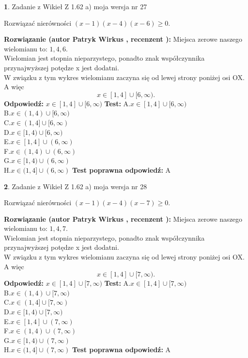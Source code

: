 \documentclass[12pt, a4paper]{article}
\theoremstyle{definition} %
\newtheorem{zad}{}
\newcommand{\zadStart}[1]{\begin{zad}#1\newline}
\newcommand{\zadStop}{\end{zad}}
\newcommand{\rozwStart}[2]{\noindent \textbf{Rozwiązanie (autor #1 , recenzent #2): }\newline}
\newcommand{\rozwStop}{\newline}
\newcommand{\odpStart}{\noindent \textbf{Odpowiedź:}\newline}
\newcommand{\odpStop}{\newline}
\newcommand{\testStart}{\noindent \textbf{Test:}\newline}
\newcommand{\testStop}{\newline}
\newcommand{\kluczStart}{\noindent \textbf{Test poprawna odpowiedź:}\newline}
\newcommand{\kluczStop}{\newline}
\begin{document}
\zadStart{Zadanie z Wikieł Z 1.62 a) moja wersja nr 27}

Rozwiązać nierówności $(x-1)(x-4)(x-6)\ge0$.
\zadStop
\rozwStart{Patryk Wirkus}{}
Miejsca zerowe naszego wielomianu to: $1, 4, 6$.\\
Wielomian jest stopnia nieparzystego, ponadto znak współczynnika przy\linebreak najwyższej potędze x jest dodatni.\\ W związku z tym wykres wielomianu zaczyna się od lewej strony poniżej osi OX. A więc $$x \in [1,4] \cup [6,\infty).$$
\rozwStop
\odpStart
$x \in [1,4] \cup [6,\infty)$
\odpStop
\testStart
A.$x \in [1,4] \cup [6,\infty)$\\
B.$x \in (1,4) \cup [6,\infty)$\\
C.$x \in (1,4] \cup [6,\infty)$\\
D.$x \in [1,4) \cup [6,\infty)$\\
E.$x \in [1,4] \cup (6,\infty)$\\
F.$x \in (1,4) \cup (6,\infty)$\\
G.$x \in [1,4) \cup (6,\infty)$\\
H.$x \in (1,4] \cup (6,\infty)$
\testStop
\kluczStart
A
\kluczStop



\zadStart{Zadanie z Wikieł Z 1.62 a) moja wersja nr 28}

Rozwiązać nierówności $(x-1)(x-4)(x-7)\ge0$.
\zadStop
\rozwStart{Patryk Wirkus}{}
Miejsca zerowe naszego wielomianu to: $1, 4, 7$.\\
Wielomian jest stopnia nieparzystego, ponadto znak współczynnika przy\linebreak najwyższej potędze x jest dodatni.\\ W związku z tym wykres wielomianu zaczyna się od lewej strony poniżej osi OX. A więc $$x \in [1,4] \cup [7,\infty).$$
\rozwStop
\odpStart
$x \in [1,4] \cup [7,\infty)$
\odpStop
\testStart
A.$x \in [1,4] \cup [7,\infty)$\\
B.$x \in (1,4) \cup [7,\infty)$\\
C.$x \in (1,4] \cup [7,\infty)$\\
D.$x \in [1,4) \cup [7,\infty)$\\
E.$x \in [1,4] \cup (7,\infty)$\\
F.$x \in (1,4) \cup (7,\infty)$\\
G.$x \in [1,4) \cup (7,\infty)$\\
H.$x \in (1,4] \cup (7,\infty)$
\testStop
\kluczStart
A
\kluczStop
\end{document}
